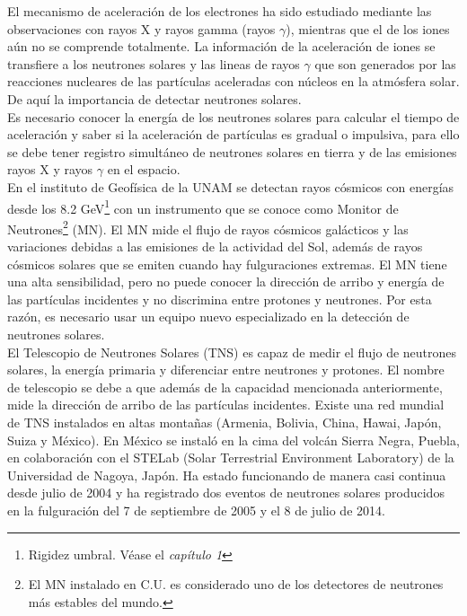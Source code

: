 El mecanismo de aceleración de los electrones ha sido estudiado mediante las observaciones con rayos X y rayos gamma (rayos $\gamma$), mientras que el de los iones aún no se comprende totalmente\cite{TNS}. La información de la aceleración de iones se transfiere a los neutrones solares y las lineas de rayos $\gamma$ que son generados por las reacciones nucleares de las partículas aceleradas con núcleos en la atmósfera solar\cite{hua1987solar}. De aquí la importancia de detectar neutrones solares.\\
 
Es necesario conocer la energía de los neutrones solares para calcular el tiempo de aceleración y saber si la aceleración de partículas es gradual o impulsiva, para ello se debe tener registro simultáneo de neutrones solares en tierra y de las emisiones rayos X y rayos $\gamma$ en el espacio\cite{TNS}.\\ 
 
 En el instituto de Geofísica de la UNAM se detectan rayos cósmicos con energías desde los 8.2 GeV\footnote{Rigidez umbral. Véase el \emph{capítulo 1}} con un instrumento que se conoce como Monitor de Neutrones\footnote{El MN instalado en C.U. es considerado uno de los detectores de neutrones más estables del mundo\cite{geo}.} (MN)\cite{geo}. El MN mide el flujo de rayos cósmicos galácticos y las variaciones debidas a las emisiones de la actividad del Sol, además de rayos cósmicos solares que se emiten cuando hay fulguraciones extremas. El MN tiene una alta sensibilidad, pero no puede conocer la dirección de arribo y energía de las partículas incidentes y no discrimina entre protones y neutrones. Por esta razón, es necesario usar un equipo nuevo especializado en la detección de neutrones solares.\\

El Telescopio de Neutrones Solares (TNS) es capaz de medir el flujo de neutrones solares, la energía primaria y diferenciar entre neutrones y protones. El nombre de telescopio se debe a que además de la capacidad mencionada anteriormente, mide la dirección de arribo de las partículas incidentes. Existe una red mundial de TNS instalados en altas montañas (Armenia, Bolivia, China, Hawai, Japón, Suiza y México). En México se instaló en la cima del volcán Sierra Negra, Puebla, en colaboración con el STELab (Solar Terrestrial Environment Laboratory) de la Universidad de Nagoya, Japón\cite{valdes}. Ha estado funcionando de manera casi continua desde julio de 2004 y ha registrado dos eventos de neutrones solares producidos en la fulguración del 7 de septiembre de 2005 y el 8 de julio de 2014\cite{Luisx,murakii}.\\

